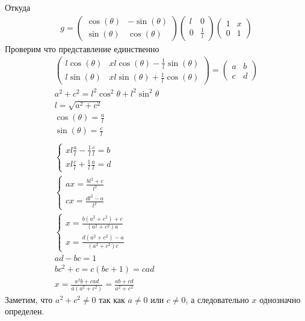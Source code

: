 	Откуда
	\begin{gather*}
		g = 
		\begin{pmatrix}
			\cos(\theta) & -\sin(\theta)\\
			\sin(\theta) & \cos(\theta)
		\end{pmatrix}
		\begin{pmatrix}
			l & 0\\
			0 & \frac{1}{l}
		\end{pmatrix}
		\begin{pmatrix}
			1 & x\\
			0 & 1
		\end{pmatrix}
	\end{gather*}
	Проверим что представление единственно
	\begin{gather*}
		\begin{pmatrix}
			l\cos(\theta) & xl\cos(\theta)-\frac{1}{l}\sin(\theta)\\
			l\sin(\theta) & xl\sin(\theta)+\frac{1}{l}\cos(\theta)
		\end{pmatrix}
		=
		\begin{pmatrix}
			a & b \\ c & d
		\end{pmatrix}\\
		a^2 + c^2 = l^2\cos^2 \theta + l^2 \sin^2 \theta\\
		l = \sqrt{a^2 + c^2}\\
		\cos(\theta) = \frac{a}{l}\\
		\sin(\theta) = \frac{c}{l}\\
		\\
		\begin{cases}
			xl \frac{a}{l} - \frac{1}{l} \frac{c}{l} = b\\
			xl \frac{c}{l} + \frac{1}{l} \frac{a}{l} = d
		\end{cases}\\
		\begin{cases}
			ax = \frac{bl^2 + c}{l^2}\\
			cx = \frac{dl^2 - a}{l^2}
		\end{cases}\\
		\begin{cases}
			x = \frac{b(a^2 + c^2) + c}{(a^2 + c^2)a}\\
			x = \frac{d(a^2 + c^2) - a}{(a^2 + c^2)c}
		\end{cases}\\
		ad - bc = 1\\
		bc^2 + c = c(bc + 1) = cad\\
		x = \frac{a^2b + cad}{a(a^2 + c^2)} = \frac{ab + cd}{a^2 + c^2}
	\end{gather*}
	Заметим, что $a^2 + c^2 \ne 0$ так как $a \ne 0$ или $c \ne 0$, а следовательно $x$ однозначно определен.
	\vskip 0.3in
	
